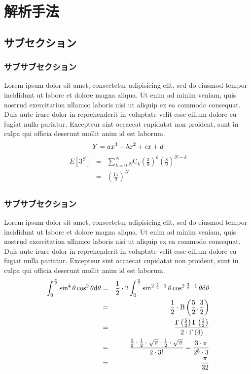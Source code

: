 \documentclass[12pt,a4j]{jreport}
\begin{document}
\chapter{解析手法}
\section{サブセクション}
\subsection{サブサブセクション}
Lorem ipsum dolor sit amet, consectetur adipisicing elit, sed do eiusmod tempor incididunt ut labore et dolore magna aliqua. Ut enim ad minim veniam, quis nostrud exercitation ullamco laboris nisi ut aliquip ex ea commodo consequat. Duis aute irure dolor in reprehenderit in voluptate velit esse cillum dolore eu fugiat nulla pariatur. Excepteur sint occaecat cupidatat non proident, sunt in culpa qui officia deserunt mollit anim id est laborum.
\begin{equation}
Y=ax^3+bx^2+cx+d \\
\end{equation}
\begin{eqnarray}
E[3^S] & = & \sum ^{N} _{k=0}{} _{N}\mathrm{C}_{k} \left( \frac{3}{9} \right)^{k} \left( \frac{8}{9} \right)^{N-k} \\
       & = & \left( \frac{11}{9}\right)^N \\
\end{eqnarray}
\subsection{サブサブセクション}
Lorem ipsum dolor sit amet, consectetur adipisicing elit, sed do eiusmod tempor incididunt ut labore et dolore magna aliqua. Ut enim ad minim veniam, quis nostrud exercitation ullamco laboris nisi ut aliquip ex ea commodo consequat. Duis aute irure dolor in reprehenderit in voluptate velit esse cillum dolore eu fugiat nulla pariatur. Excepteur sint occaecat cupidatat non proident, sunt in culpa qui officia deserunt mollit anim id est laborum.
\begin{eqnarray}
\int^\frac{\pi}{2} _0 \sin^4\theta \cos^2 \theta {\rm d} \theta &=& \frac{1}{2} \cdot 2 \int^\frac{\pi}{2} _0 \sin^{2 \cdot \frac{5}{2} -1}\theta \cos^{2 \cdot \frac{3}{2}-1} \theta {\rm d}\theta\\
&=& \frac{1}{2} \cdot \rm B \left( \frac{5}{2} , \frac{3}{2} \right)\nonumber \\
&=& \frac{\Gamma \left(\frac{5}{2} \right)\Gamma \left(\frac{3}{2} \right)}{2\cdot\Gamma \left( 4 \right)}\\
&=& \frac{\frac{3}{2} \cdot \frac{1}{2} \cdot \sqrt{\pi} \cdot \frac{1}{2} \cdot \sqrt{\pi}}{2 \cdot 3! }  =  \frac{3 \cdot \pi}{2^5 \cdot 3}\nonumber \\
&=& \frac{\pi}{32}
\end{eqnarray}
\end{document}
